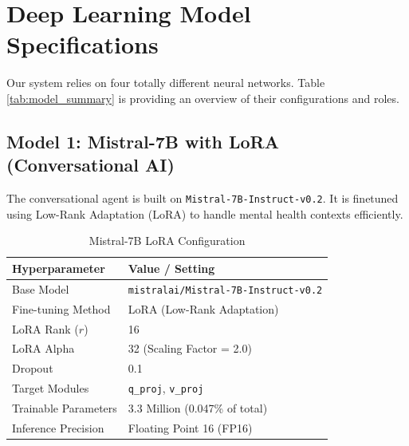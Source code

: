 \section{Deep Learning Model Specifications}
Our system relies on four totally different neural networks. Table \ref{tab:model_summary} is providing an overview of their configurations and roles.

\begin{table}[H]
\centering
\renewcommand{\arraystretch}{1.3}
\caption{Summary of AI Model Configurations}
\label{tab:model_summary}
\end{table}

\newpage
\subsection{Model 1: Mistral-7B with LoRA (Conversational AI)}
The conversational agent is built on \texttt{Mistral-7B-Instruct-v0.2}. It is finetuned using Low-Rank Adaptation (LoRA) to handle mental health contexts efficiently.

\begin{table}[H]
\centering
\renewcommand{\arraystretch}{1.2}
\begin{tabular}{|l|l|}
\hline
\rowcolor{gray!15} \textbf{Hyperparameter} & \textbf{Value / Setting} \\ \hline
Base Model & \texttt{mistralai/Mistral-7B-Instruct-v0.2} \\ \hline
Fine-tuning Method & LoRA (Low-Rank Adaptation) \\ \hline
LoRA Rank ($r$) & 16 \\ \hline
LoRA Alpha & 32 (Scaling Factor = 2.0) \\ \hline
Dropout & 0.1 \\ \hline
Target Modules & \texttt{q\_proj}, \texttt{v\_proj} \\ \hline
Trainable Parameters & 3.3 Million (0.047\% of total) \\ \hline
Inference Precision & Floating Point 16 (FP16) \\ \hline
\end{tabular}
\caption{Mistral-7B LoRA Configuration}
\label{tab:mistral_config}
\end{table}

